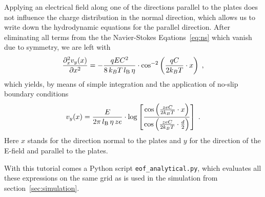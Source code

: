 Applying an electrical field along one of the directions
parallel to the plates does not influence the charge distribution in the normal direction, which allows us to write down the hydrodynamic equations for the parallel direction. After eliminating all terms from the the Navier-Stokes Eqations~\eqref{eq:ns} which vanish due to symmetry, we are left with
\begin{align}
  \frac{\partial_x^2 v_y(x)}{\partial x^2} = -\frac{q E C^2}{8 \, k_{B}T \, l_\mathrm{B} \, \eta} \cdot \cos^{-2} \left( \frac{qC}{2 k_{B}T} \cdot x \right) \; ,
\end{align}
which yields, by means of simple integration and the application of no-slip
boundary conditions
\begin{align}
  v_y(x) = \frac{E}{2 \pi \, l_\mathrm{B} \, \eta \, ze} \cdot \log \left[ \frac{\cos \left( \frac{zeC}{2 k_{B}T} \cdot x \right)}{\cos \left( \frac{zeC}{2 k_{B}T} \cdot \frac d 2 \right)} \right] \; .
\end{align}
Here $x$ stands for the direction normal to the plates and $y$ for the direction of the
E-field and parallel to the plates.

With this tutorial comes a Python script \texttt{eof\_analytical.py}, which evaluates all these expressions on the same grid as is used in the simulation from section~\ref{sec:simulation}.

\pagebreak
